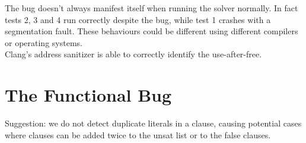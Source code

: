 \documentclass[a4paper]{article}
\begin{document}
The bug doesn't always manifest itself when running the solver normally. In fact tests 2, 3 and 4 run correctly despite the bug, while test 1 crashes with a segmentation fault. These behaviours could be different using different compilers or operating systems.\\

Clang's address sanitizer is able to correctly identify the use-after-free.\\

\section{The Functional Bug}

Suggestion: we do not detect duplicate literals in a clause, causing potential cases where clauses can be added twice to the unsat list or to the false clauses.\\
\end{document}

